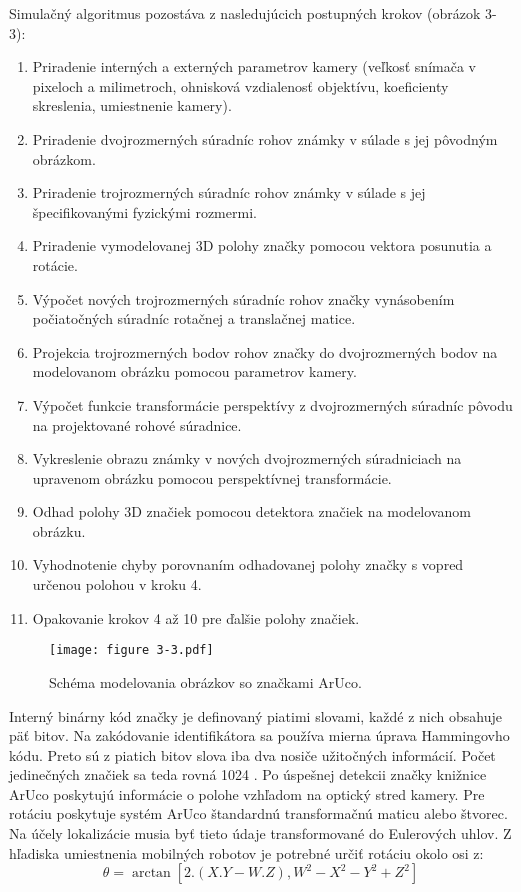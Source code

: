 \justifying
\noindent
Simulačný algoritmus pozostáva z nasledujúcich postupných krokov (obrázok 3-3):
\begin{enumerate}
\item Priradenie interných a externých parametrov kamery (veľkosť snímača v pixeloch a milimetroch, ohnisková
vzdialenosť objektívu, koeficienty skreslenia, umiestnenie kamery).
\item Priradenie dvojrozmerných súradníc rohov známky v súlade s jej pôvodným obrázkom.
\item Priradenie trojrozmerných súradníc rohov známky v súlade s jej špecifikovanými fyzickými rozmermi.
\item Priradenie vymodelovanej 3D polohy značky pomocou vektora posunutia a rotácie.
\item Výpočet nových trojrozmerných súradníc rohov značky vynásobením počiatočných súradníc rotačnej a translačnej matice.
\item Projekcia trojrozmerných bodov rohov značky do dvojrozmerných bodov na modelovanom obrázku pomocou parametrov
kamery.
\item Výpočet funkcie transformácie perspektívy z dvojrozmerných súradníc pôvodu na projektované rohové súradnice.
\item Vykreslenie obrazu známky v nových dvojrozmerných súradniciach na upravenom obrázku pomocou perspektívnej
transformácie.
\item Odhad polohy 3D značiek pomocou detektora značiek na modelovanom obrázku.
\item Vyhodnotenie chyby porovnaním odhadovanej polohy značky s vopred určenou polohou v kroku 4.
\item Opakovanie krokov 4 až 10 pre ďalšie polohy značiek.
\end{enumerate}

\begin{figure}[ht!]
\centering
\texttt{[image: figure 3-3.pdf]}
\caption{Schéma modelovania obrázkov so značkami ArUco.}
\label{o:33}
\end{figure}

\vspace{3mm}

\justifying 
\noindent 
Interný binárny kód značky je definovaný piatimi slovami, každé z nich obsahuje päť bitov. Na zakódovanie identifikátora
sa používa mierna úprava Hammingovho kódu. Preto sú z piatich bitov slova iba dva nosiče užitočných informácií. Počet
jedinečných značiek sa teda rovná 1024 \citep{garido}.
Po úspešnej detekcii značky knižnice ArUco poskytujú informácie o polohe vzhľadom na optický stred kamery. Pre
rotáciu poskytuje systém ArUco štandardnú transformačnú maticu alebo štvorec. Na účely lokalizácie musia byť tieto údaje
transformované do Eulerových uhlov. Z hľadiska umiestnenia mobilných robotov je potrebné určiť rotáciu okolo osi z:
\begin{equation}\label{r:11}
\theta = \arctan{[2.(X.Y - W.Z), W^2-X^2-Y^2+Z^2]}
\end{equation}

